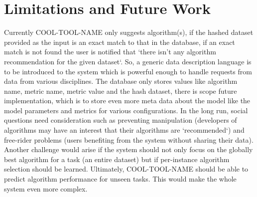 \documentclass{article}
\begin{document}
\section{Limitations and Future Work}
Currently COOL-TOOL-NAME only suggests algorithm(s), if the hashed dataset provided as the input is an exact match to that in the database, if an exact match is not found the user is notified that `there isn’t any algorithm recommendation for the given dataset`. So, a generic data description language is to be introduced to the system which is powerful enough to handle requests from data from various disciplines. The database only stores values like algorithm name, metric name, metric value and the hash dataset, there is scope  future implementation, which is to store even more meta data about the model like the model parameters and metrics for various configurations. In the long run, social questions need consideration such as preventing manipulation (developers of algorithms may have an interest that their algorithms are `recommended`) and free-rider problems (users benefiting from the system without sharing their data). Another challenge would arise if the system should not only focus on the globally best algorithm for a task (an entire dataset) but if per-instance algorithm selection should be learned. Ultimately, COOL-TOOL-NAME should be able to predict algorithm performance for unseen tasks. This would make the whole system even more complex.
\end{document}
